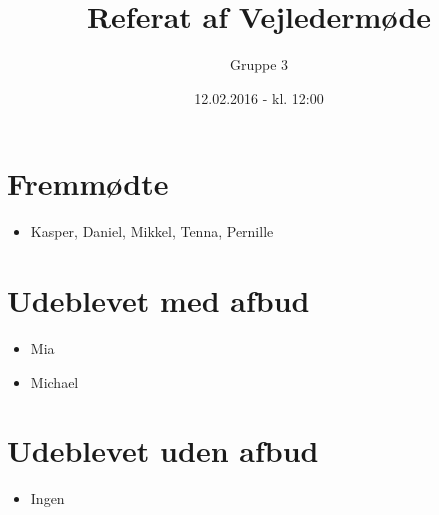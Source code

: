 \documentclass{article}
\title{Referat af Vejledermøde}
\author{Gruppe 3}
\date{12.02.2016 - kl. 12:00}
\begin{document}
	\maketitle
	
	\section{Fremmødte}
	\begin{itemize}
		\item Kasper, Daniel, Mikkel, Tenna, Pernille
	\end{itemize}
	
	\section{Udeblevet med afbud}
	\begin{itemize}
		\item Mia
		\item Michael
	\end{itemize}
	
	\section{Udeblevet uden afbud}
	\begin{itemize}
		\item Ingen
	\end{itemize}
	
\end{document}
